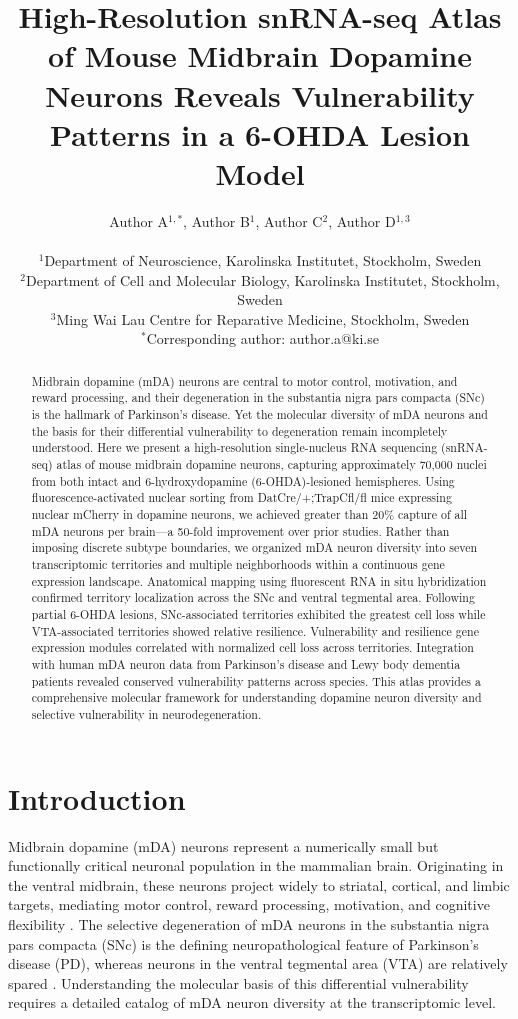\documentclass[12pt]{article}
\title{High-Resolution snRNA-seq Atlas of Mouse Midbrain Dopamine Neurons Reveals Vulnerability Patterns in a 6-OHDA Lesion Model}
\author{Author A$^{1,*}$, Author B$^{1}$, Author C$^{2}$, Author D$^{1,3}$ \\
\\
\small $^{1}$Department of Neuroscience, Karolinska Institutet, Stockholm, Sweden \\
\small $^{2}$Department of Cell and Molecular Biology, Karolinska Institutet, Stockholm, Sweden \\
\small $^{3}$Ming Wai Lau Centre for Reparative Medicine, Stockholm, Sweden \\
\small $^{*}$Corresponding author: author.a@ki.se}
\date{}
\begin{document}
\maketitle

\begin{abstract}
Midbrain dopamine (mDA) neurons are central to motor control, motivation, and reward processing, and their degeneration in the substantia nigra pars compacta (SNc) is the hallmark of Parkinson's disease. Yet the molecular diversity of mDA neurons and the basis for their differential vulnerability to degeneration remain incompletely understood. Here we present a high-resolution single-nucleus RNA sequencing (snRNA-seq) atlas of mouse midbrain dopamine neurons, capturing approximately 70,000 nuclei from both intact and 6-hydroxydopamine (6-OHDA)-lesioned hemispheres. Using fluorescence-activated nuclear sorting from DatCre/+;TrapCfl/fl mice expressing nuclear mCherry in dopamine neurons, we achieved greater than 20\% capture of all mDA neurons per brain---a 50-fold improvement over prior studies. Rather than imposing discrete subtype boundaries, we organized mDA neuron diversity into seven transcriptomic territories and multiple neighborhoods within a continuous gene expression landscape. Anatomical mapping using fluorescent RNA in situ hybridization confirmed territory localization across the SNc and ventral tegmental area. Following partial 6-OHDA lesions, SNc-associated territories exhibited the greatest cell loss while VTA-associated territories showed relative resilience. Vulnerability and resilience gene expression modules correlated with normalized cell loss across territories. Integration with human mDA neuron data from Parkinson's disease and Lewy body dementia patients revealed conserved vulnerability patterns across species. This atlas provides a comprehensive molecular framework for understanding dopamine neuron diversity and selective vulnerability in neurodegeneration.
\end{abstract}

\section{Introduction}

Midbrain dopamine (mDA) neurons represent a numerically small but functionally critical neuronal population in the mammalian brain. Originating in the ventral midbrain, these neurons project widely to striatal, cortical, and limbic targets, mediating motor control, reward processing, motivation, and cognitive flexibility \citep{bjorklund2007dopamine, roeper2013dissecting}. The selective degeneration of mDA neurons in the substantia nigra pars compacta (SNc) is the defining neuropathological feature of Parkinson's disease (PD), whereas neurons in the ventral tegmental area (VTA) are relatively spared \citep{damier1999substantia, surmeier2017selective}. Understanding the molecular basis of this differential vulnerability requires a detailed catalog of mDA neuron diversity at the transcriptomic level.
\end{document}
